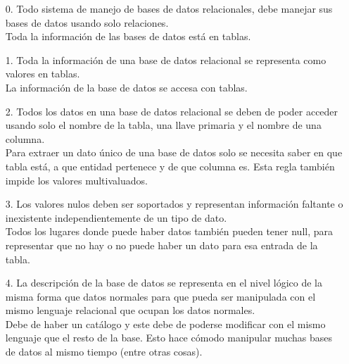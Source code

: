 \documentclass[12pt,a4paper]{article}
\begin{document}
\begin{enumerate}
\begin{enumerate}
				\begin{enumerate}
					\item[0.] Todo sistema de manejo de bases de datos relacionales,
						debe manejar sus bases de datos usando solo relaciones.\\

						Toda la información de las bases de datos está en tablas.\\

					\item[1.] Toda la información de una base de datos relacional se
						representa como valores en tablas.\\

						La información de la base de datos se accesa con tablas.\\

					\item[2.] Todos los datos en una base de datos relacional se deben
						de poder acceder usando solo el nombre de la tabla, una llave primaria
						y el nombre de una columna.\\

						Para extraer un dato único de una base de datos solo se necesita saber
						en que tabla está, a que entidad pertenece y de que columna es.
						Esta regla también impide los valores multivaluados.\\

					\item[3.] Los valores nulos deben ser soportados y representan información
						faltante o inexistente independientemente de un tipo de dato.\\

						Todos los lugares donde puede haber datos también pueden tener null,
						para representar que no hay o no puede haber un dato para esa entrada
						de la tabla.\\

					\item[4.] La descripción de la base de datos se representa en el nivel
						lógico de la misma forma que datos normales para que pueda ser
						manipulada con el mismo lenguaje relacional que ocupan los datos normales.\\

						Debe de haber un catálogo y este debe de poderse modificar con
						el mismo lenguaje que el resto de la base. Esto hace cómodo
						manipular muchas bases de datos al mismo tiempo (entre otras cosas).\\


\end{enumerate}
\end{enumerate}
\end{enumerate}
\end{document}
